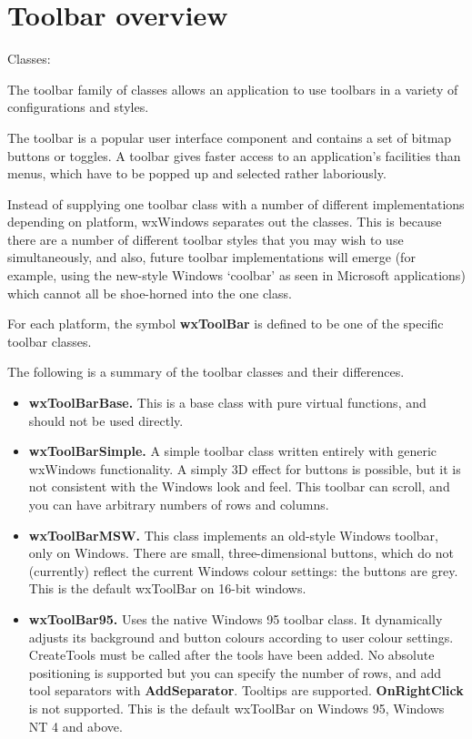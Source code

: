 \section{Toolbar overview}\label{wxtoolbaroverview}

Classes: 

The toolbar family of classes allows an application to use toolbars
in a variety of configurations and styles.

The toolbar is a popular user interface component and contains a set of bitmap
buttons or toggles. A toolbar gives faster access to an application's facilities than
menus, which have to be popped up and selected rather laboriously.

Instead of supplying one toolbar class with a number
of different implementations depending on platform, wxWindows separates
out the classes. This is because there are a number of different toolbar
styles that you may wish to use simultaneously, and also, future
toolbar implementations will emerge (for example, using the
new-style Windows `coolbar' as seen in Microsoft applications) which
cannot all be shoe-horned into the one class.

For each platform, the symbol {\bf wxToolBar} is defined to be one of the
specific toolbar classes.

The following is a summary of the toolbar classes and their differences.

\begin{itemize}\itemsep=0pt
\item {\bf wxToolBarBase.} This is a base class with pure virtual functions,
and should not be used directly.
\item {\bf wxToolBarSimple.} A simple toolbar class written entirely with generic wxWindows
functionality. A simply 3D effect for buttons is possible, but it is not consistent
with the Windows look and feel. This toolbar can scroll, and you can have arbitrary
numbers of rows and columns.
\item {\bf wxToolBarMSW.} This class implements an old-style Windows toolbar, only on
Windows. There are small, three-dimensional buttons, which do not (currently) reflect
the current Windows colour settings: the buttons are grey. This is the default wxToolBar
on 16-bit windows.
\item {\bf wxToolBar95.} Uses the native Windows 95 toolbar class. It dynamically adjusts its
background and button colours according to user colour settings.
CreateTools must be called after the tools have been added.
No absolute positioning is supported but you can specify the number
of rows, and add tool separators with {\bf AddSeparator}.
Tooltips are supported. {\bf OnRightClick} is not supported. This is the default wxToolBar
on Windows 95, Windows NT 4 and above.
\end{itemize}

